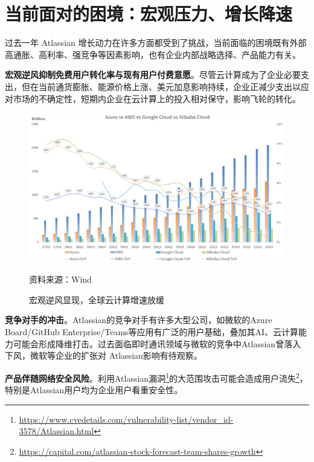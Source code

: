 \section{当前面对的困境：宏观压力、增长降速}

过去一年 Atlassian 增长动力在许多方面都受到了挑战，当前面临的困境既有外部高通胀、高利率、强竞争等因素影响，也有企业内部战略选择、产品能力有关。

\textbf{宏观逆风抑制免费用户转化率与现有用户付费意愿}。尽管云计算成为了企业必要支出，但在当前通货膨胀、能源价格上涨、美元加息影响持续，企业正减少支出以应对市场的不确定性，短期内企业在云计算上的投入相对保守，影响飞轮的转化。
\begin{figure}[H]
    \caption{宏观逆风显现，全球云计算增速放缓}
    \begin{center}
        \includegraphics[width=\linewidth]{img/cloud.png}
    \end{center}
    \footnotesize{资料来源：Wind}
\end{figure}

\textbf{竞争对手的冲击}。Atlassian的竞争对手有许多大型公司，如微软的Azure Board/GitHub Enterprise/Teams等应用有广泛的用户基础，叠加其AI、云计算能力可能会形成降维打击。过去面临即时通讯领域与微软的竞争中Atlassian曾落入下风，微软等企业的扩张对 Atlassian影响有待观察。

\textbf{产品伴随网络安全风险}。利用Atlassian漏洞\footnote{\url{https://www.cvedetails.com/vulnerability-list/vendor_id-3578/Atlassian.html}}的大范围攻击可能会造成用户流失\footnote{\url{https://capital.com/atlassian-stock-forecast-team-shares-growth}}，特别是Atlassian用户均为企业用户看重安全性。

